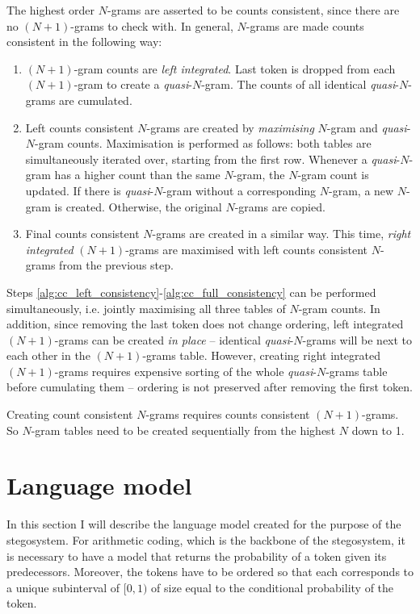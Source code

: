\documentclass[draft]{IIBproject}
\makeatletter
\DeclareRobustCommand*{\ie}{i.e.\@\xspace}
\DeclareRobustCommand{\npgram}{\mbox{$(N{+}1)$-gram}\@\xspace}
\DeclareRobustCommand{\npgrams}{\mbox{$(N{+}1)$-grams}\@\xspace}
\makeatother
\begin{document}
The highest order $N$-grams are asserted to be counts consistent, since there are no \npgrams to check with. In general, $N$-grams are made counts consistent in the following way:

\begin{enumerate}
\item \label{alg:cc_left_integration} \npgram counts are \emph{left integrated}. Last token is dropped from each \npgram to create a \emph{quasi}-$N$-gram. The counts of all identical \emph{quasi}-$N$-grams are cumulated.
\item \label{alg:cc_left_consistency} Left counts consistent $N$-grams are created by \emph{maximising} $N$-gram and \emph{quasi}-$N$-gram counts. Maximisation is performed as follows: both tables are simultaneously iterated over, starting from the first row. Whenever a \emph{quasi}-$N$-gram has a higher count than the same $N$-gram, the $N$-gram count is updated. If there is \emph{quasi}-$N$-gram without a corresponding $N$-gram, a new $N$-gram is created. Otherwise, the original $N$-grams are copied.
\item \label{alg:cc_full_consistency} Final counts consistent $N$-grams are created in a similar way. This time, \emph{right integrated} \npgrams are maximised with left counts consistent $N$-grams from the previous step.
\end{enumerate}

Steps \ref{alg:cc_left_consistency}-\ref{alg:cc_full_consistency} can be performed simultaneously, \ie jointly maximising all three tables of $N$-gram counts. In addition, since removing the last token does not change ordering, left integrated \npgrams can be created \emph{in place} -- identical \emph{quasi}-$N$-grams will be next to each other in the \npgrams table. However, creating right integrated \npgrams requires expensive sorting of the whole \emph{quasi}-$N$-grams table before cumulating them -- ordering is not preserved after removing the first token.

Creating count consistent $N$-grams requires counts consistent \npgrams. So $N$-gram tables need to be created sequentially from the highest $N$ down to 1.

\cleardoublepage
\section{Language model}
\label{sec:language_model}

In this section I will describe the language model created for the purpose of the stegosystem. For arithmetic coding, which is the backbone of the stegosystem, it is necessary to have a model that returns the probability of a token given its predecessors. Moreover, the tokens have to be ordered so that each corresponds to a unique subinterval of $[0,1)$ of size equal to the conditional probability of the token.
\end{document}
